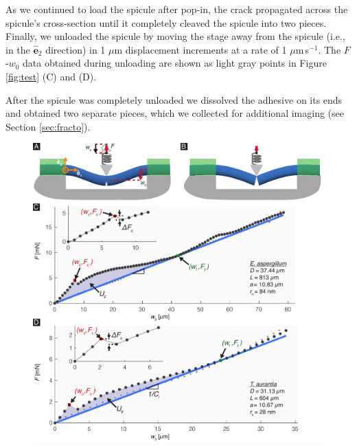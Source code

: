 \documentclass[12pt,onecolumn]{article}
\newcommand{\ey}{{\bm{\hat{e}}}_2}
\begin{document}
\begin{bibunit}
As we continued to load the spicule after pop-in, the crack propagated across the spicule's cross-section until it completely cleaved the spicule into two pieces. Finally, we unloaded the spicule by moving the stage away from the spicule (i.e., in the $\ey$ direction) in 1 $\mu$m displacement increments at a rate of 1 $\mu$m\,s$^{-1}$. The $F$-$w_0$ data obtained during unloading are shown as light gray points in Figure \ref{fig:test} (C) and (D).

After the spicule was completely unloaded we dissolved the adhesive on its ends and obtained two separate pieces, which we collected for additional imaging (see Section \ref{sec:fracto}).
%
			\begin{figure}[ht!]
			\centering
			\includegraphics[width=\textwidth]{../Figures/FigureTest/Figure4_V7A.pdf}

\end{figure}
\end{bibunit}
\end{document}
